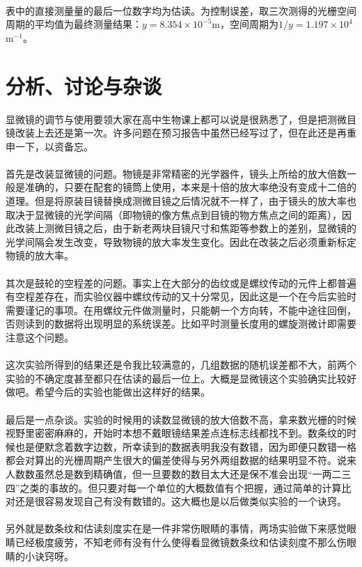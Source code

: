 \documentclass[11pt]{article} %
\begin{document}
\paragraph{}
表中的直接测量量的最后一位数字均为估读。为控制误差，取三次测得的光栅空间周期的平均值为最终测量结果：$y=8.354×10^{-5}$m，空间周期为$1/y=1.197×10^4$m$^{-1}$。

\section{分析、讨论与杂谈}
显微镜的调节与使用要领大家在高中生物课上都可以说是很熟悉了，但是把测微目镜改装上去还是第一次。许多问题在预习报告中虽然已经写过了，但在此还是再重申一下，以资备忘。
\paragraph{}
首先是改装显微镜的问题。物镜是非常精密的光学器件，镜头上所给的放大倍数一般是准确的，只要在配套的镜筒上使用，本来是十倍的放大率绝没有变成十二倍的道理。但是将原装目镜替换成测微目镜之后情况就不一样了，由于镜头的放大率也取决于显微镜的光学间隔（即物镜的像方焦点到目镜的物方焦点之间的距离），因此改装上测微目镜之后，由于新老两块目镜尺寸和焦距等参数上的差别，显微镜的光学间隔会发生改变，导致物镜的放大率发生变化。因此在改装之后必须重新标定物镜的放大率。
\paragraph{}
其次是鼓轮的空程差的问题。事实上在大部分的齿纹或是螺纹传动的元件上都普遍有空程差存在，而实验仪器中螺纹传动的又十分常见，因此这是一个在今后实验时需要谨记的事项。在用螺纹元件做测量时，只能朝一个方向转，不能中途往回倒，否则读到的数据将出现明显的系统误差。比如平时测量长度用的螺旋测微计即需要注意这个问题。
\paragraph{}
这次实验所得到的结果还是令我比较满意的，几组数据的随机误差都不大，前两个实验的不确定度甚至都只在估读的最后一位上。大概是显微镜这个实验确实比较好做吧。希望今后的实验也能做出这样好的结果。
\paragraph{}
最后是一点杂谈。实验的时候用的读数显微镜的放大倍数不高，拿来数光栅的时候视野里密密麻麻的，开始时本想不戴眼镜结果差点连标志线都找不到。数条纹的时候也是便默念着数字边数，所幸读到的数据表明我没有数错，因为即便只数错一格都会对算出的光栅周期产生很大的偏差使得与另外两组数据的结果明显不符。说来人数数虽然总是数到精确值，但一旦要数的数目太大还是保不准会出现“一两二三四”之类的事故的。但只要对每一个单位的大概数值有个把握，通过简单的计算比对还是很容易发现自己有没有数错的。这大概也是以后做类似实验的一个诀窍。
\paragraph{}
另外就是数条纹和估读刻度实在是一件非常伤眼睛的事情，两场实验做下来感觉眼睛已经极度疲劳，不知老师有没有什么使得看显微镜数条纹和估读刻度不那么伤眼睛的小诀窍呀。
\end{document}
